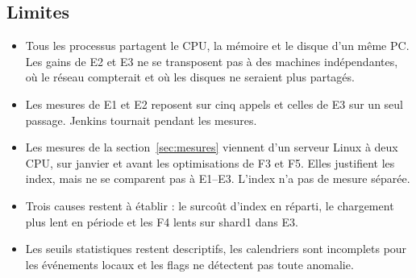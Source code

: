 \subsection{Limites}
\begin{itemize}
\item Tous les processus partagent le CPU, la mémoire et le disque d'un même PC. Les gains de E2 et
E3 ne se transposent pas à des machines indépendantes, où le réseau compterait et où les disques ne
seraient plus partagés.
\item Les mesures de E1 et E2 reposent sur cinq appels et celles de E3 sur un seul passage. Jenkins
tournait pendant les mesures.
\item Les mesures de la section~\ref{sec:mesures} viennent d'un serveur Linux à deux CPU, sur janvier
et avant les optimisations de F3 et F5. Elles justifient les index, mais ne se comparent pas à E1--E3.
L'index  n'a pas de mesure séparée.
\item Trois causes restent à établir : le surcoût d'index en réparti, le chargement plus lent en
période et les F4 lents sur shard1 dans E3.
\item Les seuils statistiques restent descriptifs, les calendriers sont incomplets pour les événements
locaux et les flags ne détectent pas toute anomalie. 
\end{itemize}
